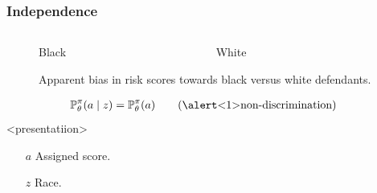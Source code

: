 \begin{frame}
  \frametitle{Independence}
  \begin{figure}[H]
    \begin{columns}
      \begin{column}{0.5\textwidth}
        \centering
        \def\svgwidth{.95\columnwidth}
        
        Black
      \end{column}
      \begin{column}{0.5\textwidth}
        \centering
        \def\svgwidth{0.95\columnwidth}
              
        White
      \end{column}
    \end{columns}
    \label{fig:risk-bias}
    \caption{Apparent bias in risk scores towards black versus white defendants.}
  \end{figure}
  \begin{align}
    \Pr^\pi_\param(a \mid z) &= \Pr_\param^\pi(a) \tag{\alert<1>{non-discrimination}}
  \end{align}
  \only<presentatiion>{
    \begin{itemize}
    \item[$a$] Assigned score.
    \item[$z$] Race.
    \end{itemize}
  }
\end{frame}

